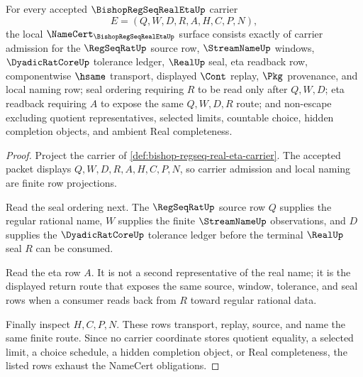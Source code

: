 \begin{theorem}
\label{thm:bishop-regseq-real-eta-namecert-obligations}
For every accepted $\BishopRegSeqRealEtaUp$ carrier
$$
E=(Q,W,D,R,A,H,C,P,N),
$$
the local $\NameCert_{\BishopRegSeqRealEtaUp}$ surface consists exactly of carrier admission for the $\RegSeqRatUp$ source row, $\StreamNameUp$ windows, $\DyadicRatCoreUp$ tolerance ledger, $\RealUp$ seal, eta readback row, componentwise $\hsame$ transport, displayed $\Cont$ replay, $\Pkg$ provenance, and local naming row; seal ordering requiring $R$ to be read only after $Q,W,D$; eta readback requiring $A$ to expose the same $Q,W,D,R$ route; and non-escape excluding quotient representatives, selected limits, countable choice, hidden completion objects, and ambient Real completeness.
\end{theorem}
\begin{proof}
Project the carrier of \autoref{def:bishop-regseq-real-eta-carrier}. The accepted packet displays $Q,W,D,R,A,H,C,P,N$, so carrier admission and local naming are finite row projections.

Read the seal ordering next. The $\RegSeqRatUp$ source row $Q$ supplies the regular rational name, $W$ supplies the finite $\StreamNameUp$ observations, and $D$ supplies the $\DyadicRatCoreUp$ tolerance ledger before the terminal $\RealUp$ seal $R$ can be consumed.

Read the eta row $A$. It is not a second representative of the real name; it is the displayed return route that exposes the same source, window, tolerance, and seal rows when a consumer reads back from $R$ toward regular rational data.

Finally inspect $H,C,P,N$. These rows transport, replay, source, and name the same finite route. Since no carrier coordinate stores quotient equality, a selected limit, a choice schedule, a hidden completion object, or Real completeness, the listed rows exhaust the NameCert obligations.
\end{proof}

